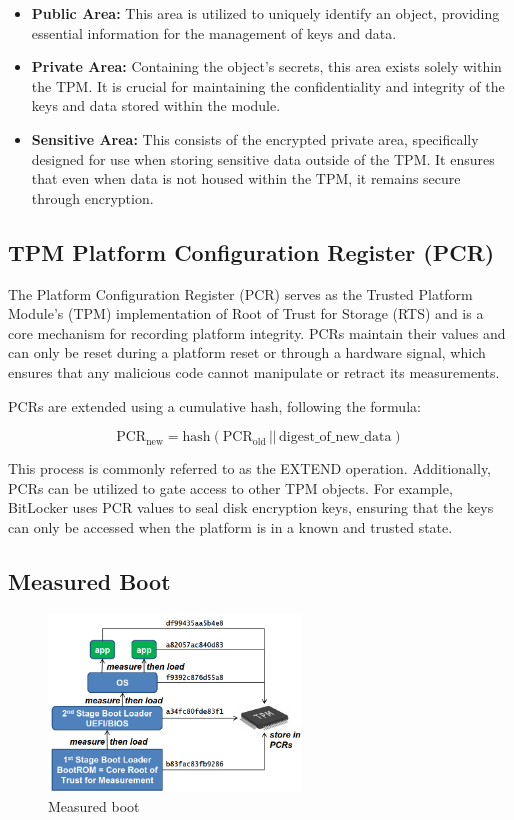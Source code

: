 \begin{itemize}
  \item \textbf{Public Area:} This area is utilized to uniquely
    identify an object, providing essential information for the
    management of keys and data.

  \item \textbf{Private Area:} Containing the object's secrets, this
    area exists solely within the TPM. It is crucial for maintaining
    the confidentiality and integrity of the keys and data stored
    within the module.

  \item \textbf{Sensitive Area:} This consists of the encrypted
    private area, specifically designed for use when storing sensitive
    data outside of the TPM. It ensures that even when data is not
    housed within the TPM, it remains secure through encryption.
\end{itemize}

\subsection{TPM Platform Configuration Register (PCR)}

The Platform Configuration Register (PCR) serves as the Trusted
Platform Module's (TPM) implementation of Root of Trust for Storage
(RTS) and is a core mechanism for recording platform integrity. PCRs
maintain their values and can only be reset during a platform reset or
through a hardware signal, which ensures that any malicious code
cannot manipulate or retract its measurements.

PCRs are extended using a cumulative hash, following the formula:

\[
\text{PCR}_{\text{new}} = \text{hash}(\text{PCR}_{\text{old}} \, || \, \text{digest\_of\_new\_data})
\]

This process is commonly referred to as the EXTEND operation.
Additionally, PCRs can be utilized to gate access to other TPM
objects. For example, BitLocker uses PCR values to seal disk
encryption keys, ensuring that the keys can only be accessed when the
platform is in a known and trusted state.

\subsection{Measured Boot}
\begin{figure}[H]
  \centering
  \includegraphics[width=0.6\textwidth]{img/Measured boot.png}
  \caption{Measured boot}
\end{figure}
